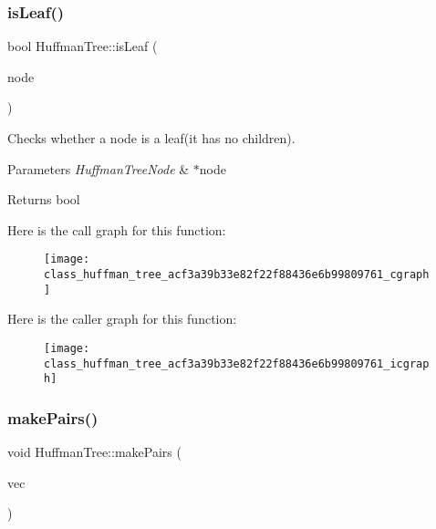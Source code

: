 \subsubsection{\texorpdfstring{is\+Leaf()}{isLeaf()}}
{\footnotesize\ttfamily bool Huffman\+Tree\+::is\+Leaf (\begin{DoxyParamCaption}\item[{Huffman\+Tree\+Node $\ast$}]{node }\end{DoxyParamCaption})\hspace{0.3cm}{\ttfamily [inline]}}

Checks whether a node is a leaf(it has no children). 
\begin{DoxyParams}{Parameters}
{\em Huffman\+Tree\+Node} & $\ast$node \\
\hline
\end{DoxyParams}
\begin{DoxyReturn}{Returns}
bool 
\end{DoxyReturn}
Here is the call graph for this function\+:\nopagebreak
\begin{figure}[H]
\begin{center}
\leavevmode
\texttt{[image: class\_huffman\_tree\_acf3a39b33e82f22f88436e6b99809761\_cgraph]}
\end{center}
\end{figure}
Here is the caller graph for this function\+:\nopagebreak
\begin{figure}[H]
\begin{center}
\leavevmode
\texttt{[image: class\_huffman\_tree\_acf3a39b33e82f22f88436e6b99809761\_icgraph]}
\end{center}
\end{figure}
\mbox{\label{class_huffman_tree_aad4e7b29b81e1b64d1eb48a3bd70747f}} 
\subsubsection{\texorpdfstring{make\+Pairs()}{makePairs()}}
{\footnotesize\ttfamily void Huffman\+Tree\+::make\+Pairs (\begin{DoxyParamCaption}\item[{std\+::vector$<$ std\+::pair$<$ char, std\+::string $>$$>$ \&}]{vec }\end{DoxyParamCaption})}

